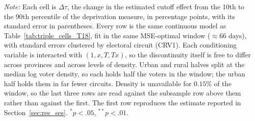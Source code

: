 \begin{table}[ht]
\centering
\caption{The socioeconomic gradient in the compulsory-voting effect,
conditioning on geography (age-18 cutoff).}
\label{tab:gradient_geography}
\par\vspace{0.6em}
{\footnotesize\begin{minipage}{\linewidth}\emph{Note:} Each cell is
$\Delta\tau$, the change in the estimated cutoff effect from the 10th to the
90th percentile of the deprivation measure, in percentage points, with its
standard error in parentheses. Every row is the same continuous model as
Table~\ref{tab:triple_cells_T18}, fit in the same MSE-optimal window
($\approx$66 days), with standard errors clustered by electoral circuit (CRV1).
Each conditioning variable is interacted with $(1, x, T, Tx)$, so the
discontinuity itself is free to differ across provinces and across levels of
density. Urban and rural halves split at the median log voter density, so each
holds half the voters in the window; the urban half holds them in far fewer
circuits. Density is unavailable for $0.15\%$ of the window, so the last three
rows are read against the subsample row above them rather than against the
first. The first row reproduces the estimate reported in
Section~\ref{sec:res_ses}. $^{*}p<.05$, $^{**}p<.01$.
\end{minipage}}
\end{table}
